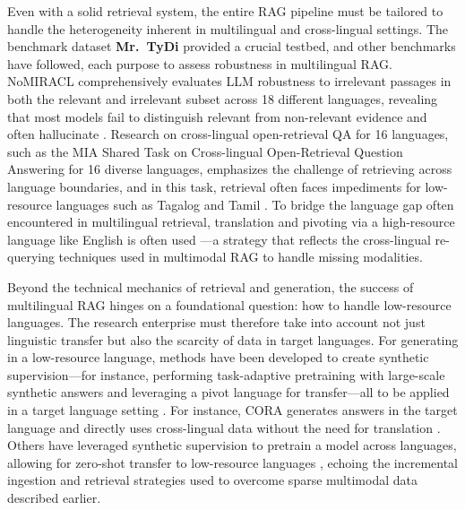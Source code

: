 \documentclass[11pt]{article}
\begin{document}
Even with a solid retrieval system, the entire RAG pipeline must be tailored to handle the heterogeneity inherent in multilingual and cross-lingual settings. The benchmark dataset \textbf{Mr.~TyDi} provided a crucial testbed, and other benchmarks have followed, each purpose to assess robustness in multilingual RAG. NoMIRACL comprehensively evaluates LLM robustness to irrelevant passages in both the relevant and irrelevant subset across 18 different languages, revealing that most models fail to distinguish relevant from non-relevant evidence and often hallucinate \cite{ref265} \cite{ref265}. Research on cross-lingual open-retrieval QA for 16 languages, such as the MIA Shared Task on Cross-lingual Open-Retrieval Question Answering for 16 diverse languages, emphasizes the challenge of retrieving across language boundaries, and in this task, retrieval often faces impediments for low-resource languages such as Tagalog and Tamil \cite{ref377}. To bridge the language gap often encountered in multilingual retrieval, translation and pivoting via a high-resource language like English is often used \cite{ref378}---a strategy that reflects the cross-lingual re-querying techniques used in multimodal RAG to handle missing modalities.

Beyond the technical mechanics of retrieval and generation, the success of multilingual RAG hinges on a foundational question: how to handle low-resource languages. The research enterprise must therefore take into account not just linguistic transfer but also the scarcity of data in target languages. For generating in a low-resource language, methods have been developed to create synthetic supervision---for instance, performing task-adaptive pretraining with large-scale synthetic answers and leveraging a pivot language for transfer---all to be applied in a target language setting \cite{ref373} \cite{ref379}. For instance, CORA generates answers in the target language and directly uses cross-lingual data without the need for translation \cite{ref373}. Others have leveraged synthetic supervision to pretrain a model across languages, allowing for zero-shot transfer to low-resource languages \cite{ref380}, echoing the incremental ingestion and retrieval strategies used to overcome sparse multimodal data described earlier.
\end{document}
